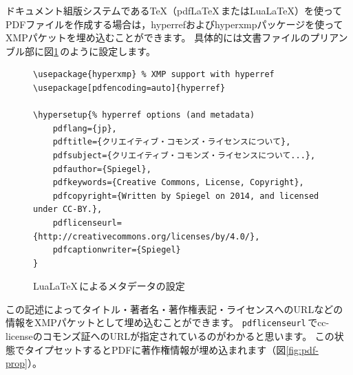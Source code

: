\documentclass{ltjsarticle}
\begin{document}
ドキュメント組版システムである\TeX（pdf\LaTeX\,またはLua\LaTeX）を使ってPDFファイルを作成する場合は，hyperrefおよびhyperxmpパッケージを使ってXMPパケットを埋め込むことができます。
具体的には文書ファイルのプリアンブル部に図\ref{fig:hyperxmp}\,のように設定します。
\begin{figure}[htp]
\begin{mdframed}
\small
\begin{verbatim}
\usepackage{hyperxmp} % XMP support with hyperref
\usepackage[pdfencoding=auto]{hyperref}

\hypersetup{% hyperref options (and metadata)
    pdflang={jp},
    pdftitle={クリエイティブ・コモンズ・ライセンスについて},
    pdfsubject={クリエイティブ・コモンズ・ライセンスについて...},
    pdfauthor={Spiegel},
    pdfkeywords={Creative Commons, License, Copyright},
    pdfcopyright={Written by Spiegel on 2014, and licensed under CC-BY.},
    pdflicenseurl={http://creativecommons.org/licenses/by/4.0/},
    pdfcaptionwriter={Spiegel}
}
\end{verbatim}
\end{mdframed}
\caption{Lua\LaTeX\,によるメタデータの設定} \label{fig:hyperxmp}
\end{figure}%
この記述によってタイトル・著者名・著作権表記・ライセンスへのURLなどの情報をXMPパケットとして埋め込むことができます。
\verb|pdflicenseurl|\,でcc-licenseのコモンズ証へのURLが指定されているのがわかると思います。
この状態でタイプセットするとPDFに著作権情報が埋め込まれます（図\ref{fig:pdf-prop}）。
\end{document}
